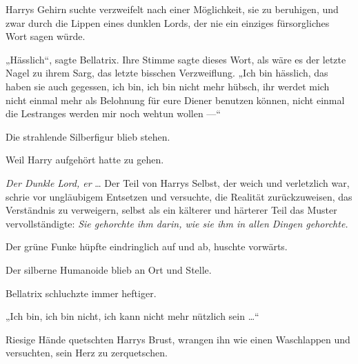 Harrys Gehirn suchte verzweifelt nach einer Möglichkeit, sie zu beruhigen, und zwar durch die Lippen eines dunklen Lords, der nie ein einziges fürsorgliches Wort sagen würde.

„Hässlich“, sagte Bellatrix. Ihre Stimme sagte dieses Wort, als wäre es der letzte Nagel zu ihrem Sarg, das letzte bisschen Verzweiflung.
„Ich bin hässlich, das haben sie auch gegessen, ich bin, ich bin nicht mehr hübsch, ihr werdet mich nicht einmal mehr als Belohnung für eure Diener benutzen können, nicht einmal die Lestranges werden mir noch wehtun wollen —“

Die strahlende Silberfigur blieb stehen.

Weil Harry aufgehört hatte zu gehen.

\emph{Der Dunkle Lord, er} … Der Teil von Harrys Selbst, der weich und verletzlich war, schrie vor ungläubigem Entsetzen und versuchte, die Realität zurückzuweisen, das Verständnis zu verweigern, selbst als ein kälterer und härterer Teil das Muster vervollständigte: \emph{Sie gehorchte ihm darin, wie sie ihm in allen Dingen gehorchte.}

Der grüne Funke hüpfte eindringlich auf und ab, huschte vorwärts.

Der silberne Humanoide blieb an Ort und Stelle.

Bellatrix schluchzte immer heftiger.

„Ich bin, ich bin nicht, ich kann nicht mehr nützlich sein …“

Riesige Hände quetschten Harrys Brust, wrangen ihn wie einen Waschlappen und versuchten, sein Herz zu zerquetschen.

